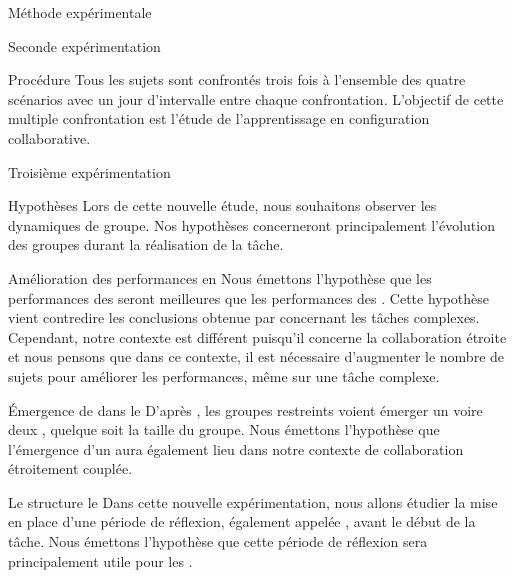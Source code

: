 \documentclass[myfrancais,ngerman,english,frenchb]{mythesis}
\begin{document}
\begin{mychapter}{Méthode expérimentale}
\begin{mysection}{Seconde expérimentation}
\begin{mysubsection}{Procédure}
				Tous les sujets sont confrontés trois fois à l'ensemble des quatre scénarios avec un jour d'intervalle entre chaque confrontation.
				L'objectif de cette multiple confrontation est l'étude de l'apprentissage en configuration collaborative.
			\end{mysubsection}
		\end{mysection}
		\begin{mysection}{Troisième expérimentation}
			\begin{mysubsection}{Hypothèses}
				Lors de cette nouvelle étude, nous souhaitons observer les dynamiques de groupe.
				Nos hypothèses concerneront principalement l'évolution des groupes durant la réalisation de la tâche.
				\begin{myparagraph}{ Amélioration des performances en }
					Nous émettons l'hypothèse que les performances des  seront meilleures que les performances des .
					Cette hypothèse vient contredire les conclusions obtenue par  concernant les tâches complexes.
					Cependant, notre contexte est différent puisqu'il concerne la collaboration étroite et nous pensons que dans ce contexte, il est nécessaire d'augmenter le nombre de sujets pour améliorer les performances, même sur une tâche complexe.
				\end{myparagraph}
				\begin{myparagraph}{ Émergence de  dans le }
					D'après , les groupes restreints voient émerger un voire deux , quelque soit la taille du groupe.
					Nous émettons l'hypothèse que l'émergence d'un  aura également lieu dans notre contexte de collaboration étroitement couplée.
				\end{myparagraph}
				\begin{myparagraph}{ Le \mybrainstorming structure le }
					Dans cette nouvelle expérimentation, nous allons étudier la mise en place d'une période de réflexion, également appelée \mybrainstorming, avant le début de la tâche.
					Nous émettons l'hypothèse que cette période de réflexion sera principalement utile pour les .
				\end{myparagraph}

\end{mysubsection}
\end{mysection}
\end{mychapter}
\end{document}
